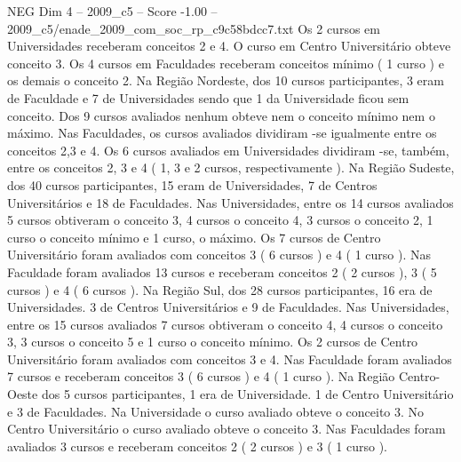 \begin{textsample}{NEG Dim 4 – 2009\_c5 – Score -1.00 – 2009\_c5/enade\_2009\_com\_soc\_rp\_c9c58bdcc7.txt}
Os 2 cursos em Universidades receberam conceitos 2 e 4.
O curso em Centro Universitário obteve conceito 3.
Os 4 cursos em Faculdades receberam conceitos mínimo ( 1 curso ) e os demais o conceito 2.
Na Região Nordeste, dos 10 cursos participantes, 3 eram de Faculdade e 7 de Universidades sendo que 1 da Universidade ficou sem conceito.
Dos 9 cursos avaliados nenhum obteve nem o conceito mínimo nem o máximo.
Nas Faculdades, os cursos avaliados dividiram -se igualmente entre os conceitos 2,3 e 4.
Os 6 cursos avaliados em Universidades dividiram -se, também, entre os conceitos 2, 3 e 4 ( 1, 3 e 2 cursos, respectivamente ).
Na Região Sudeste, dos 40 cursos participantes, 15 eram de Universidades, 7 de Centros Universitários e 18 de Faculdades.
Nas Universidades, entre os 14 cursos avaliados 5 cursos obtiveram o conceito 3, 4 cursos o conceito 4, 3 cursos o conceito 2, 1 curso o conceito mínimo e 1 curso, o máximo.
Os 7 cursos de Centro Universitário foram avaliados com conceitos 3 ( 6 cursos ) e 4 ( 1 curso ).
Nas Faculdade foram avaliados 13 cursos e receberam conceitos 2 ( 2 cursos ), 3 ( 5 cursos ) e 4 ( 6 cursos ).
Na Região Sul, dos 28 cursos participantes, 16 era de Universidades. 3 de Centros Universitários e 9 de Faculdades.
Nas Universidades, entre os 15 cursos avaliados 7 cursos obtiveram o conceito 4, 4 cursos o conceito 3, 3 cursos o conceito 5 e 1 curso o conceito mínimo.
Os 2 cursos de Centro Universitário foram avaliados com conceitos 3 e 4.
Nas Faculdade foram avaliados 7 cursos e receberam conceitos 3 ( 6 cursos ) e 4 ( 1 curso ).
Na Região Centro-Oeste dos 5 cursos participantes, 1 era de Universidade. 1 de Centro Universitário e 3 de Faculdades.
Na Universidade o curso avaliado obteve o conceito 3.
No Centro Universitário o curso avaliado obteve o conceito 3.
Nas Faculdades foram avaliados 3 cursos e receberam conceitos 2 ( 2 cursos ) e 3 ( 1 curso ).

\end{textsample}
